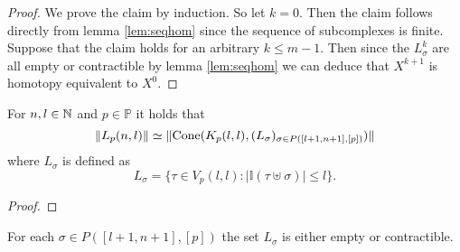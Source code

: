 \begin{proof}
  We prove the claim by induction. So let $k = 0$. Then the claim follows directly from lemma \ref{lem:seqhom} since the sequence of subcomplexes is finite.
  Suppose that the claim holds for an arbitrary $k \leq m - 1$. Then since the $L^k_\sigma$ are all empty or contractible by lemma \ref{lem:seqhom} we can deduce that $X^{k+1}$ is homotopy equivalent to $X^0$.
\end{proof}

\begin{col}\label{col:lnpkll}
  For $n,l \in \mathbb{N}$ and $p \in \mathbb{P}$ it holds that \[\lVert L_p(n,l) \rVert \simeq \lVert {\rm Cone}(K_p(l,l), (L_\sigma)_{\sigma \in P([l+1,n+1],[p])})\rVert \] where $L_\sigma$ is defined as \[L_\sigma = \{\tau\in V_p(l,l)\colon \left|\mathbb{I}(\tau\uplus\sigma)\right| \leq l\}.\]
\end{col}

\begin{proof}
  
\end{proof}

\begin{lemma}\label{lem:Lsigsimeq}
  For each $\sigma \in P([l+1,n+1], [p])$ the set $L_\sigma$ is either empty or contractible.
\end{lemma}

